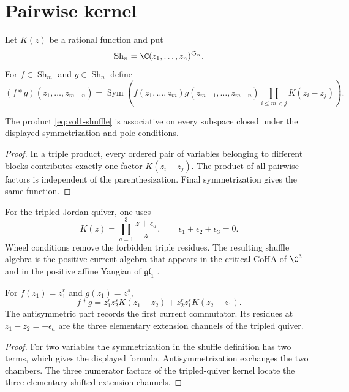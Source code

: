 \section{Pairwise kernel}
Let $K(z)$ be a rational function and put
\[
 \operatorname{Sh}_n=\C(z_1,\ldots,z_n)^{\mathfrak S_n}.
\]
For $f\in\operatorname{Sh}_m$ and $g\in\operatorname{Sh}_n$ define
\begin{equation}\label{eq:vol1-shuffle}
 (f*g)(z_1,\ldots,z_{m+n})
 =\operatorname{Sym}
 \left(
 f(z_1,\ldots,z_m)g(z_{m+1},\ldots,z_{m+n})
 \prod_{i\le m<j}K(z_i-z_j)
 \right).
\end{equation}

\begin{theorem}
The product \eqref{eq:vol1-shuffle} is associative on every subspace closed under the displayed symmetrization and pole conditions.
\end{theorem}
\begin{proof}
In a triple product, every ordered pair of variables belonging to different blocks contributes exactly one factor $K(z_i-z_j)$.  The product of all pairwise factors is independent of the parenthesization.  Final symmetrization gives the same function.
\end{proof}

For the tripled Jordan quiver, one uses
\[
 K(z)=\prod_{a=1}^3\frac{z+\epsilon_a}{z},
 \qquad \epsilon_1+\epsilon_2+\epsilon_3=0.
\]
Wheel conditions remove the forbidden triple residues.  The resulting shuffle algebra is the positive current algebra that appears in the critical CoHA of $\C^3$ and in the positive affine Yangian of $\mathfrak{gl}_1$ \cite{SVYangians,Tsymbaliuk}.

\begin{calculation}
For $f(z_1)=z_1^r$ and $g(z_1)=z_1^s$,
\[
 f*g
 =z_1^rz_2^sK(z_1-z_2)+z_2^rz_1^sK(z_2-z_1).
\]
The antisymmetric part records the first current commutator.  Its residues at $z_1-z_2=-\epsilon_a$ are the three elementary extension channels of the tripled quiver.
\end{calculation}
\begin{proof}
For two variables the symmetrization in the shuffle definition has two terms, which gives the displayed formula.  Antisymmetrization exchanges the two chambers.  The three numerator factors of the tripled-quiver kernel locate the three elementary shifted extension channels.
\end{proof}

